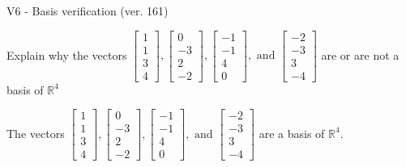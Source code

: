 \begin{exercise}
  \begin{exerciseTitle}V6 - Basis verification (ver. 161)\end{exerciseTitle}
  \begin{exerciseStatement}
    Explain why the vectors \(\left[\begin{array}{r}
1 \\
1 \\
3 \\
4
\end{array}\right] , \left[\begin{array}{r}
0 \\
-3 \\
2 \\
-2
\end{array}\right] , \left[\begin{array}{r}
-1 \\
-1 \\
4 \\
0
\end{array}\right] , \text{ and } \left[\begin{array}{r}
-2 \\
-3 \\
3 \\
-4
\end{array}\right]\) are or are not a basis of \(\mathbb{R}^4\)	


  \end{exerciseStatement}
  \begin{exerciseAnswer}
   The vectors \(\left[\begin{array}{r}
1 \\
1 \\
3 \\
4
\end{array}\right] , \left[\begin{array}{r}
0 \\
-3 \\
2 \\
-2
\end{array}\right] , \left[\begin{array}{r}
-1 \\
-1 \\
4 \\
0
\end{array}\right] , \text{ and } \left[\begin{array}{r}
-2 \\
-3 \\
3 \\
-4
\end{array}\right]\) 
  	 are  a basis of \(\mathbb{R}^4\).
  


  \end{exerciseAnswer}
\end{exercise}